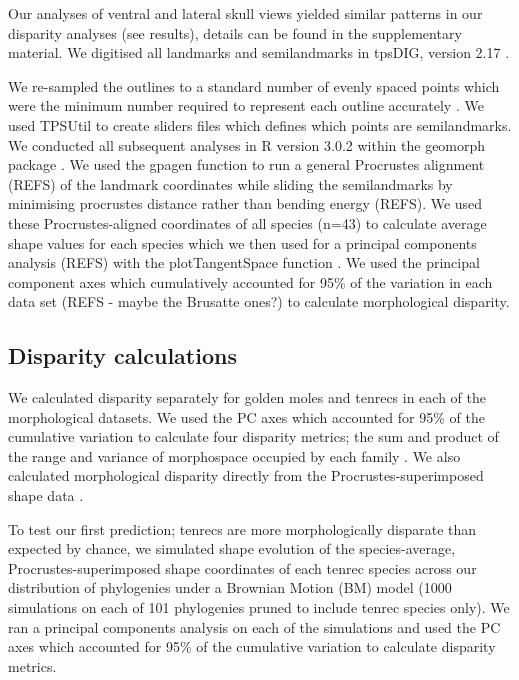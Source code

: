 \documentclass[12pt,a4paper]{article}
\begin{document}
Our analyses of ventral and lateral skull views yielded similar patterns in our disparity analyses (see results), details can be found in the supplementary material. We digitised all landmarks and semilandmarks in tpsDIG, version 2.17 \citep{Rohlf2013}.



We re-sampled the outlines to a standard number of evenly spaced points which were the minimum number required to represent each outline accurately \citep[][details in supplementary material]{MacLeod2013}. We used TPSUtil \citep{Rohlf2012} to create sliders files \citep{Zelditch2012} which defines which points are semilandmarks. We conducted all subsequent analyses in R version 3.0.2 \citep[R Development Core][]{Team2013} within the geomorph package \citep{Adams2013}. We used the gpagen function to run a general Procrustes alignment (REFS) of the landmark coordinates while sliding the semilandmarks by minimising procrustes distance rather than bending energy (REFS). We used these Procrustes-aligned coordinates of all species (n=43) to calculate average shape values for each species which we then used for a principal components analysis (REFS) with the plotTangentSpace function \citep{Adams2013}.  We used the principal component axes which cumulatively accounted for 95\% of the variation in each data set (REFS - maybe the Brusatte ones?)  to calculate morphological disparity.




\subsection{Disparity calculations} 


We calculated disparity separately for golden moles and tenrecs in each of the morphological datasets. We used the PC axes which accounted for 95\% of the cumulative variation to calculate four disparity metrics; the sum and product of the range and variance of morphospace occupied by each family \citep{Brusatte2008, Foth2012, Ruta2013}. We also calculated morphological disparity directly from the Procrustes-superimposed shape data \citep{Zelditch2012}. 

To test our first prediction; tenrecs are more morphologically disparate than expected by chance, we simulated shape evolution  \citep{Harmon2008} of the species-average, Procrustes-superimposed shape coordinates of each tenrec species across our distribution of phylogenies under a Brownian Motion (BM) model (1000 simulations on each of 101 phylogenies pruned to include tenrec species only). We ran a principal components analysis on each of the simulations and used the PC axes which accounted for 95\% of the cumulative variation to calculate disparity metrics.
 
\end{document}
